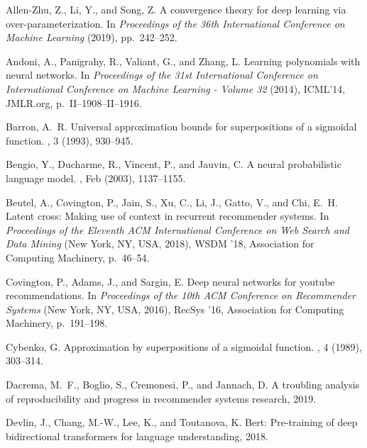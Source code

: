 \documentclass{article}
\begin{document}
\begin{thebibliography}{10}

{\sc Allen-Zhu, Z., Li, Y., and Song, Z.}
\newblock A convergence theory for deep learning via over-parameterization.
\newblock In {\em Proceedings of the 36th International Conference on Machine
  Learning\/} (2019), pp.~242--252.

{\sc Andoni, A., Panigrahy, R., Valiant, G., and Zhang, L.}
\newblock Learning polynomials with neural networks.
\newblock In {\em Proceedings of the 31st International Conference on
  International Conference on Machine Learning - Volume 32\/} (2014),
  ICML’14, JMLR.org, p.~II–1908–II–1916.

{\sc Barron, A.~R.}
\newblock Universal approximation bounds for superpositions of a sigmoidal
  function.
, 3 (1993), 930--945.

{\sc Bengio, Y., Ducharme, R., Vincent, P., and Jauvin, C.}
\newblock A neural probabilistic language model.
, Feb (2003), 1137--1155.

{\sc Beutel, A., Covington, P., Jain, S., Xu, C., Li, J., Gatto, V., and Chi,
  E.~H.}
\newblock Latent cross: Making use of context in recurrent recommender systems.
\newblock In {\em Proceedings of the Eleventh ACM International Conference on
  Web Search and Data Mining\/} (New York, NY, USA, 2018), WSDM ’18,
  Association for Computing Machinery, p.~46–54.

{\sc Covington, P., Adams, J., and Sargin, E.}
\newblock Deep neural networks for youtube recommendations.
\newblock In {\em Proceedings of the 10th ACM Conference on Recommender
  Systems\/} (New York, NY, USA, 2016), RecSys ’16, Association for Computing
  Machinery, p.~191–198.

{\sc Cybenko, G.}
\newblock Approximation by superpositions of a sigmoidal function.
, 4 (1989),
  303--314.

{\sc Dacrema, M.~F., Boglio, S., Cremonesi, P., and Jannach, D.}
\newblock A troubling analysis of reproducibility and progress in recommender
  systems research, 2019.

{\sc Devlin, J., Chang, M.-W., Lee, K., and Toutanova, K.}
\newblock Bert: Pre-training of deep bidirectional transformers for language
  understanding, 2018.


\end{thebibliography}
\end{document}
